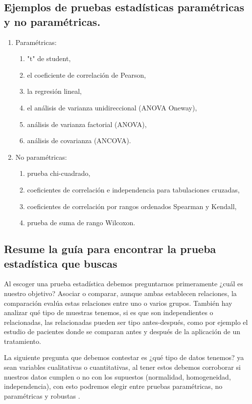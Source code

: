 \documentclass[]{article}
\begin{document}
\subsection{Ejemplos de pruebas estadísticas	paramétricas y no paramétricas.}
\begin{enumerate}    
\item Paramétricas:

  \begin{enumerate}
    \item "t" de student,
    \item el coeficiente de correlación de Pearson,
    \item la regresión lineal,
    \item el análisis de varianza unidireccional (ANOVA Oneway), 
    \item análisis de varianza factorial (ANOVA), 
    \item análisis de covarianza (ANCOVA).

  \end{enumerate}
  
\item No paramétricas:
  \begin{enumerate}
    \item prueba chi-cuadrado,
    \item coeficientes de correlación e independencia para tabulaciones cruzadas,
    \item coeficientes de correlación por rangos ordenados Spearman y Kendall,
    \item prueba de suma de rango Wilcoxon.
  \end{enumerate}
\end{enumerate}


\subsection{Resume la guía para encontrar la prueba estadística que buscas}
Al escoger una prueba estadística debemos preguntarnos primeramente ¿cuál es nuestro objetivo? Asociar o comparar, aunque ambas establecen relaciones, la comparación evalúa estas relaciones entre uno o varios grupos.
También hay analizar qué tipo de muestras tenemos, si es que son independientes o relacionadas, las relacionadas pueden ser tipo antes-después, como por ejemplo el estudio de pacientes donde se comparan antes y después de la aplicación de un tratamiento.

La siguiente pregunta que debemos contestar es ¿qué tipo de datos tenemos? ya sean variables cualitativas o cuantitativas, al tener estos debemos corroborar si nuestros datos cumplen o no con los supuestos (normalidad, homogeneidad, independencia), con esto podremos elegir entre pruebas paramétricas, no paramétricas y robustas \cite{Articulo_3}.
\end{document}
